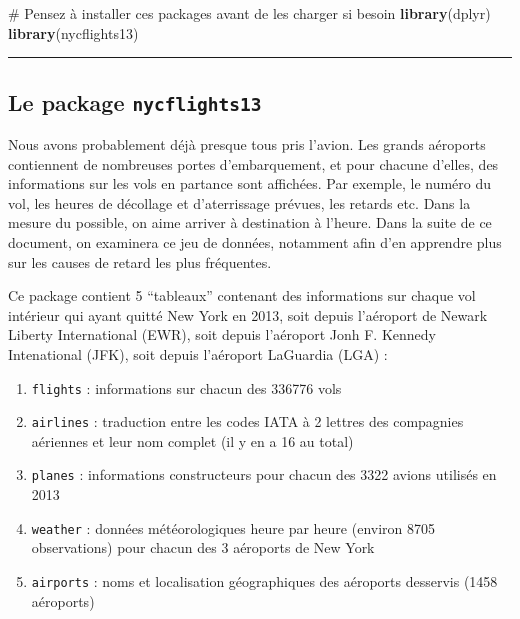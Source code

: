 \documentclass[a4paperpaper,]{article}
\newenvironment{Shaded}{\begin{snugshade}}{\end{snugshade}}
\newcommand{\CommentTok}[1]{\textcolor[rgb]{0.54,0.53,0.53}{#1}}
\newcommand{\KeywordTok}[1]{\textcolor[rgb]{0.12,0.11,0.11}{\textbf{#1}}}
\newcommand{\NormalTok}[1]{\textcolor[rgb]{0.12,0.11,0.11}{#1}}
\providecommand{\tightlist}{%
  \setlength{\itemsep}{0pt}\setlength{\parskip}{0pt}}
\theoremstyle{definition}
\theoremstyle{definition}
\theoremstyle{definition}
\theoremstyle{remark}
\begin{document}
\begin{Shaded}
\begin{Highlighting}[]
\CommentTok{# Pensez à installer ces packages avant de les charger si besoin }
\KeywordTok{library}\NormalTok{(dplyr)}
\KeywordTok{library}\NormalTok{(nycflights13)}
\end{Highlighting}
\end{Shaded}

\begin{center}\rule{0.5\linewidth}{\linethickness}\end{center}

\hypertarget{le-package-nycflights13}{%
\subsection{\texorpdfstring{Le package
\texttt{nycflights13}}{Le package nycflights13}}\label{le-package-nycflights13}}

Nous avons probablement déjà presque tous pris l'avion. Les grands
aéroports contiennent de nombreuses portes d'embarquement, et pour
chacune d'elles, des informations sur les vols en partance sont
affichées. Par exemple, le numéro du vol, les heures de décollage et
d'aterrissage prévues, les retards etc. Dans la mesure du possible, on
aime arriver à destination à l'heure. Dans la suite de ce document, on
examinera ce jeu de données, notamment afin d'en apprendre plus sur les
causes de retard les plus fréquentes.

Ce package contient 5 ``tableaux'' contenant des informations sur chaque
vol intérieur qui ayant quitté New York en 2013, soit depuis l'aéroport
de Newark Liberty International (EWR), soit depuis l'aéroport Jonh F.
Kennedy Intenational (JFK), soit depuis l'aéroport LaGuardia (LGA) :

\begin{enumerate}
\def\labelenumi{\arabic{enumi}.}
\tightlist
\item
  \texttt{flights} : informations sur chacun des 336776 vols
\item
  \texttt{airlines} : traduction entre les codes IATA à 2 lettres des
  compagnies aériennes et leur nom complet (il y en a 16 au total)
\item
  \texttt{planes} : informations constructeurs pour chacun des 3322
  avions utilisés en 2013
\item
  \texttt{weather} : données météorologiques heure par heure (environ
  8705 observations) pour chacun des 3 aéroports de New York
\item
  \texttt{airports} : noms et localisation géographiques des aéroports
  desservis (1458 aéroports)
\end{enumerate}
\end{document}
